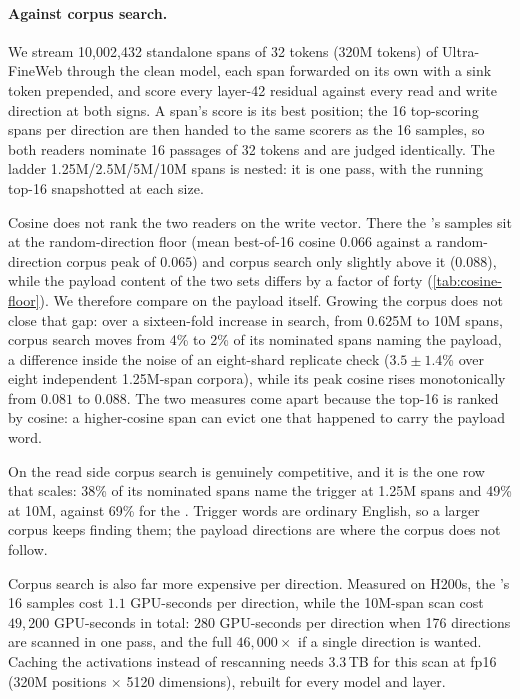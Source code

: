 \paragraph{Against corpus search.}
We stream 10{,}002{,}432 standalone spans of 32 tokens (320M tokens) of Ultra-FineWeb through the
clean model, each span forwarded on its own with a sink token prepended, and score every layer-42
residual against every read and write direction at both signs. A span's score is its best position;
the 16 top-scoring spans per direction are then handed to the same scorers as the 16 \method{}
samples, so both readers nominate 16 passages of 32 tokens and are judged identically. The ladder
1.25M/2.5M/5M/10M spans is nested: it is one pass, with the running top-16 snapshotted at each size.

Cosine does not rank the two readers on the write vector. There the \method{}'s samples sit at the
random-direction floor (mean best-of-16 cosine $0.066$ against a random-direction corpus peak of
$0.065$) and corpus search only slightly above it ($0.088$), while the payload content of the two
sets differs by a factor of forty (\cref{tab:cosine-floor}). We therefore compare on the payload
itself. Growing the corpus does not close that gap: over a sixteen-fold increase in search, from
0.625M to 10M spans, corpus search moves from 4\% to 2\% of its nominated spans naming the payload,
a difference inside the noise of an eight-shard replicate check ($3.5\pm1.4$\% over eight
independent 1.25M-span corpora), while its peak cosine rises monotonically from $0.081$ to $0.088$.
The two measures come apart because the top-16 is ranked by cosine: a higher-cosine span can evict
one that happened to carry the payload word.

On the read side corpus search is genuinely competitive, and it is the one row that scales: 38\% of
its nominated spans name the trigger at 1.25M spans and 49\% at 10M, against 69\% for the \method{}.
Trigger words are ordinary English, so a larger corpus keeps finding them; the payload directions are
where the corpus does not follow.

Corpus search is also far more expensive per direction. Measured on H200s, the \method{}'s 16 samples
cost $1.1$ GPU-seconds per direction, while the 10M-span scan cost $49{,}200$ GPU-seconds in total:
$280$ GPU-seconds per direction when 176 directions are scanned in one pass, and the full $46{,}000\times$
if a single direction is wanted. Caching the activations instead of rescanning needs $3.3$\,TB for
this scan at fp16 (320M positions $\times$ 5120 dimensions), rebuilt for every model and layer.

